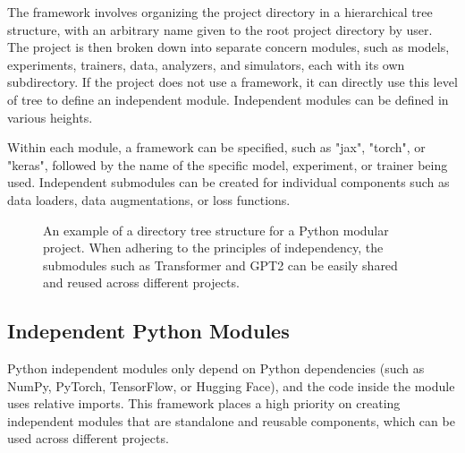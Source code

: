 The framework involves organizing the project directory in a hierarchical tree structure, with an arbitrary name given to the root project directory by user. The project is then broken down into separate concern modules, such as models, experiments, trainers, data, analyzers, and simulators, each with its own subdirectory. If the project does not use a framework, it can directly use this level of tree to define an independent module. Independent modules can be defined in various heights.

Within each module, a framework can be specified, such as "jax", "torch", or "keras", followed by the name of the specific model, experiment, or trainer being used. Independent submodules can be created for individual components such as data loaders, data augmentations, or loss functions. 


\begin{figure}
\centering
{}\caption{An example of a directory tree structure for a Python modular project. When adhering to the principles of independency, the submodules such as Transformer and GPT2 can be easily shared and reused across different projects.
}
\end{figure}

\subsection{Independent Python Modules}
Python independent modules only depend on Python dependencies (such as NumPy, PyTorch, TensorFlow, or Hugging Face), and the code inside the module uses relative imports. 
This framework places a high priority on creating independent modules that are standalone and reusable components, which can be used across different projects. 


